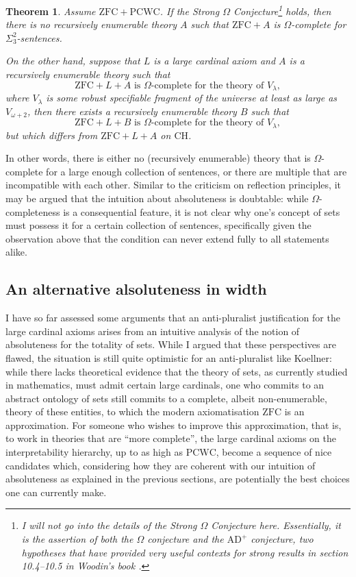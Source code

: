 \documentclass[12pt]{article}
\theoremstyle{plain}
\newtheorem{theorem}{Theorem}[section]
\theoremstyle{definition}
\newcommand{\ZFC}{\mathrm{ZFC}}
\newcommand{\CH}{\mathrm{CH}}
\newcommand{\PCWC}{\mathrm{PCWC}}
\newcommand{\AD}{\mathrm{AD}}
\begin{document}
\begin{theorem}
	Assume $\ZFC + \PCWC$.  If the \emph{Strong $\Omega$ Conjecture}\footnote{I will not go into the details of the Strong $\Omega$ Conjecture here. Essentially, it is the assertion of both the $\Omega$ conjecture and the $\AD^+$ conjecture, two hypotheses that have provided very useful contexts for strong results in section 10.4--10.5 in Woodin's book \cite{woodin-de-gruyter}.} holds, then there is no recursively enumerable theory $A$ such that $\ZFC + A$ is $\Omega$-complete for $\Sigma^2_3$-sentences.

	On the other hand, suppose that $L$ is a
	large cardinal axiom and $A$ is a recursively enumerable theory such that
	\[\text{$\ZFC + L + A$ is $\Omega$-complete for the theory of $V_\lambda$},\]
	where $V_\lambda$ is some \emph{robust specifiable fragment} of the universe at least as large as $V_{\omega + 2}$, then there exists a recursively enumerable theory $B$ such that
	\[\text{$\ZFC + L + B$ is $\Omega$-complete for the theory of $V_\lambda$},\]
	but which differs from $\ZFC + L + A$ on $\CH$.
\end{theorem}

In other words, there is either no (recursively enumerable) theory that is $\Omega$-complete for a large enough collection of sentences, or there are multiple that are incompatible with each other. Similar to the criticism on reflection principles, it may be argued that the intuition about absoluteness is doubtable: while $\Omega$-completeness is a consequential feature, it is not clear why one's concept of sets must possess it for a certain collection of sentences, specifically given the observation above that the condition can never extend fully to all statements alike.

\subsection{An alternative alsoluteness in width}

I have so far assessed some arguments that an anti-pluralist justification for the large cardinal axioms arises from an intuitive analysis of the notion of absoluteness for the totality of sets. While I argued that these perspectives are flawed, the situation is still quite optimistic for an anti-pluralist like Koellner: while there lacks theoretical evidence that the theory of sets, as currently studied in mathematics, must admit certain large cardinals, one who commits to an abstract ontology of sets still commits to a complete, albeit non-enumerable, theory of these entities, to which the modern axiomatisation $\ZFC$ is an approximation. For someone who wishes to improve this approximation, that is, to work in theories that are ``more complete'', the large cardinal axioms on the interpretability hierarchy, up to as high as $\PCWC$, become a sequence of nice candidates which, considering how they are coherent with our intuition of absoluteness as explained in the previous sections, are potentially the best choices one can currently make.
\end{document}
